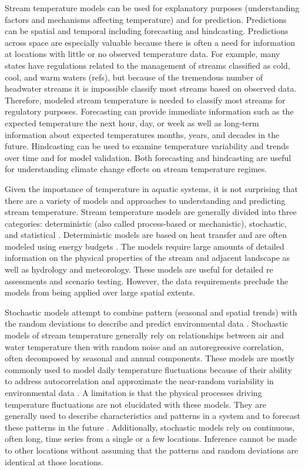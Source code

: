 \documentclass[]{article}
\begin{document}
Stream temperature models can be used for explanatory purposes
(understanding factors and mechanisms affecting temperature) and for
prediction. Predictions can be spatial and temporal including
forecasting and hindcasting. Predictions across space are especially
valuable because there is often a need for information at locations with
little or no observed temperature data. For example, many states have
regulations related to the management of streams classified as cold,
cool, and warm waters (refs), but because of the tremendous number of
headwater streams it is impossible classify most streams based on
observed data. Therefore, modeled stream temperature is needed to
classify most streams for regulatory purposes. Forecasting can provide
immediate information such as the expected temperature the next hour,
day, or week as well as long-term information about expected
temperatures months, years, and decades in the future. Hindcasting can
be used to examine temperature variability and trends over time and for
model validation. Both forecasting and hindcasting are useful for
understanding climate change effects on stream temperature regimes.

Given the importance of temperature in aquatic systems, it is not
surprising that there are a variety of models and approaches to
understanding and predicting stream temperature. Stream temperature
models are generally divided into three categories: deterministic (also
called process-based or mechanistic), stochastic, and statistical
\citep{Chang2013, Caissie2006, Benyahya2007}. Deterministic models are
based on heat transfer and are often modeled using energy budgets
\citep{Benyahya2007, Caissie2006}. The models require large amounts of
detailed information on the physical properties of the stream and
adjacent landscape as well as hydrology and meteorology. These models
are useful for detailed re assessments and scenario testing. However,
the data requirements preclude the models from being applied over large
spatial extents.

Stochastic models attempt to combine pattern (seasonal and spatial
trends) with the random deviations to describe and predict environmental
data \citep{Chang2013, Sura2006, Kiraly2002}. Stochastic models of
stream temperature generally rely on relationships between air and water
temperature then with random noise and an autoregressive correlation,
often decomposed by seasonal and annual components. These models are
mostly commonly used to model daily temperature fluctuations because of
their ability to address autocorrelation and approximate the near-random
variability in environmental data
\citep{Kiraly2002, Caissie2001, Ahmadi-Nedushan2007}. A limitation is
that the physical processes driving temperature fluctuations are not
elucidated with these models. They are generally used to describe
characteristics and patterns in a system and to forecast these patterns
in the future \citep{Kiraly2002}. Additionally, stochastic models rely
on continuous, often long, time series from a single or a few locations.
Inference cannot be made to other locations without assuming that the
patterns and random deviations are identical at those locations.
\end{document}
